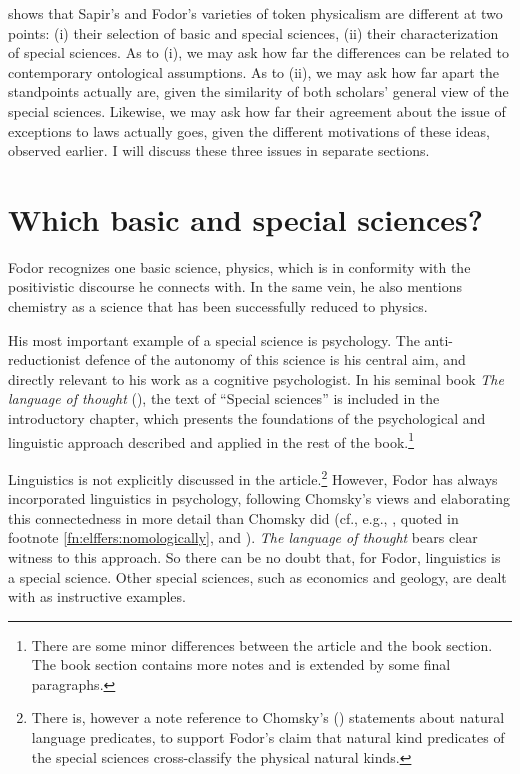 \documentclass[output=paper]{langscibook}
\begin{document}
 shows that Sapir's and Fodor's varieties of token physicalism are different at two points: (i) their selection of basic and special sciences, (ii) their characterization of special sciences. As to (i), we may ask how far the differences can be related to contemporary ontological assumptions. As to (ii), we may ask how far apart the standpoints actually are, given the similarity of both scholars' general view of the special sciences. Likewise, we may ask how far their agreement about the issue of exceptions to laws actually goes, given the different motivations of these ideas, observed earlier. I will discuss these three issues in separate sections.

\section{Which basic and special sciences?}
\label{sec:elffers:basicspecial}

Fodor recognizes one basic science, physics, which is in conformity with the positivistic discourse he connects with. In the same vein, he also mentions chemistry as a science that has been successfully reduced to physics.

His most important example of a special science is psychology. The anti-reductionist defence of the autonomy of this science is his central aim, and directly relevant to his work as a cognitive psychologist. In his seminal book \emph{The language of thought} (\citeyear{Fodor1975}), the text of ``Special sciences'' is included in the introductory chapter, which presents the foundations of the psychological and linguistic approach described and applied in the rest of the book.\footnote{There are some minor differences between the article and the book section. The book section contains more notes and is extended by some final paragraphs.}

Linguistics is not explicitly discussed in the \citeyear{Fodor1974} article.\footnote{There is, however a note reference to Chomsky's (\citeyear{Chomsky1965}) statements about natural language predicates, to support Fodor's claim that natural kind predicates of the special sciences cross-classify the physical natural kinds.} However, Fodor has always incorporated linguistics in psychology, following Chomsky's views and elaborating this connectedness in more detail than Chomsky did (cf., e.g., \citealt[149]{Fodor1985}, quoted in footnote \ref{fn:elffers:nomologically}, and \citealt[278]{LoewerRey1991}). \emph{The language of thought} bears clear witness to this approach. So there can be no doubt that, for Fodor, linguistics is a special science. Other special sciences, such as economics and geology, are dealt with as instructive examples.
\end{document}
